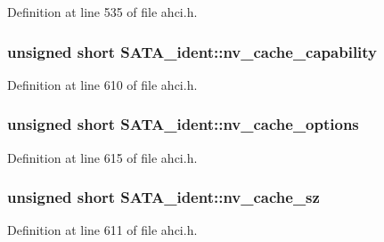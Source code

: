 Definition at line 535 of file ahci.\+h.

\subsubsection[{\texorpdfstring{nv\+\_\+cache\+\_\+capability}{nv_cache_capability}}]{\setlength{\rightskip}{0pt plus 5cm}unsigned short S\+A\+T\+A\+\_\+ident\+::nv\+\_\+cache\+\_\+capability}\hypertarget{structSATA__ident_ad1ca0009d9c3bb07fc592074c4d0fa71}{}\label{structSATA__ident_ad1ca0009d9c3bb07fc592074c4d0fa71}


Definition at line 610 of file ahci.\+h.

\subsubsection[{\texorpdfstring{nv\+\_\+cache\+\_\+options}{nv_cache_options}}]{\setlength{\rightskip}{0pt plus 5cm}unsigned short S\+A\+T\+A\+\_\+ident\+::nv\+\_\+cache\+\_\+options}\hypertarget{structSATA__ident_a1cc18559fb89be13ccce7858162049b4}{}\label{structSATA__ident_a1cc18559fb89be13ccce7858162049b4}


Definition at line 615 of file ahci.\+h.

\subsubsection[{\texorpdfstring{nv\+\_\+cache\+\_\+sz}{nv_cache_sz}}]{\setlength{\rightskip}{0pt plus 5cm}unsigned short S\+A\+T\+A\+\_\+ident\+::nv\+\_\+cache\+\_\+sz}\hypertarget{structSATA__ident_a0a2b0b5c33bf357f681b9c96f82ac845}{}\label{structSATA__ident_a0a2b0b5c33bf357f681b9c96f82ac845}


Definition at line 611 of file ahci.\+h.

